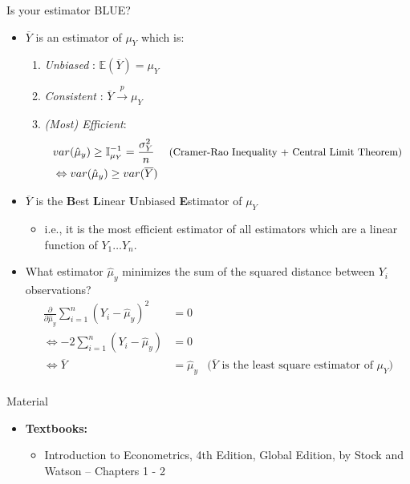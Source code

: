 \documentclass[notes,10pt, aspectratio=169]{beamer}
\begin{document}
\begin{frame}{Is your estimator BLUE?}
\begin{itemize}
    \item $\overline{Y}$ is an estimator of  $\mu_Y$ which is:
    \begin{enumerate}
        \item \textit{Unbiased} : $\mathbb{E}(\overline{Y}) = \mu_Y$
        \item \textit{Consistent} : $\overline{Y}\xrightarrow{\mathit{p}}\mu_Y$
        \item \textit{(Most) Efficient}: \begin{eqnarray*}
        & var(\hat{\mu}_y)\geq \mathbb{I}_{\mu_Y}^{-1} = \frac{\sigma_Y^2}{n} &\text{\small (Cramer-Rao Inequality + Central Limit Theorem)}\\
        & \Leftrightarrow var(\hat{\mu}_y)\geq var(\overline{Y})
        \end{eqnarray*}
    \end{enumerate}
    \item $\overline{Y}$ is the \textbf{B}est \textbf{L}inear \textbf{U}nbiased \textbf{E}stimator of  $\mu_Y$
    \begin{itemize}
        \item i.e., it is the most efficient estimator of all estimators which are a linear function of $Y_1\dots Y_n$.
    \end{itemize}
    \item What estimator $\hat{\mu}_y$ minimizes the sum of the squared distance between $Y_i$ observations?
        \begin{eqnarray*}
            \frac{\partial}{\partial\hat{\mu}_y} \sum_{i=1}^n (Y_i- \hat{\mu}_y)^2 &=0\\
           \Leftrightarrow -2\sum_{i=1}^n (Y_i- \hat{\mu}_y)&=0\\
           \Leftrightarrow \overline{Y}&=\hat{\mu}_y & \text{($\overline{Y}$ is the least square estimator of $\mu_Y$)}\\
        \end{eqnarray*}
    \end{itemize}
\end{frame}


\begin{frame}[allowframebreaks]{Material}
\begin{itemize}
    \item[--] \textbf{Textbooks:}
    \begin{itemize}
        \item Introduction to Econometrics, 4th Edition, Global Edition, by Stock and Watson -- Chapters 1 - 2
    \end{itemize}
\end{itemize}
\end{frame}
\end{document}
